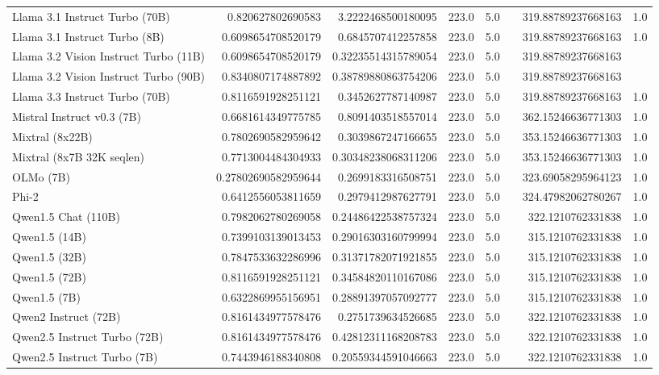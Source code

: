 \begin{table}[htp]
{\begin{tabular}{lrrrrrrr}
Llama 3.1 Instruct Turbo (70B) & 0.820627802690583 & 3.2222468500180095 & 223.0 & 5.0 &  & 319.88789237668163 & 1.0 \\
Llama 3.1 Instruct Turbo (8B) & 0.6098654708520179 & 0.6845707412257858 & 223.0 & 5.0 &  & 319.88789237668163 & 1.0 \\
Llama 3.2 Vision Instruct Turbo (11B) & 0.6098654708520179 & 0.32235514315789054 & 223.0 & 5.0 &  & 319.88789237668163 &  \\
Llama 3.2 Vision Instruct Turbo (90B) & 0.8340807174887892 & 0.38789880863754206 & 223.0 & 5.0 &  & 319.88789237668163 &  \\
Llama 3.3 Instruct Turbo (70B) & 0.8116591928251121 & 0.3452627787140987 & 223.0 & 5.0 &  & 319.88789237668163 & 1.0 \\
Mistral Instruct v0.3 (7B) & 0.6681614349775785 & 0.8091403518557014 & 223.0 & 5.0 &  & 362.15246636771303 & 1.0 \\
Mixtral (8x22B) & 0.7802690582959642 & 0.3039867247166655 & 223.0 & 5.0 &  & 353.15246636771303 & 1.0 \\
Mixtral (8x7B 32K seqlen) & 0.7713004484304933 & 0.30348238068311206 & 223.0 & 5.0 &  & 353.15246636771303 & 1.0 \\
OLMo (7B) & 0.27802690582959644 & 0.2699183316508751 & 223.0 & 5.0 &  & 323.69058295964123 & 1.0 \\
Phi-2 & 0.6412556053811659 & 0.2979412987627791 & 223.0 & 5.0 &  & 324.47982062780267 & 1.0 \\
Qwen1.5 Chat (110B) & 0.7982062780269058 & 0.24486422538757324 & 223.0 & 5.0 &  & 322.1210762331838 & 1.0 \\
Qwen1.5 (14B) & 0.7399103139013453 & 0.29016303160799994 & 223.0 & 5.0 &  & 315.1210762331838 & 1.0 \\
Qwen1.5 (32B) & 0.7847533632286996 & 0.31371782071921855 & 223.0 & 5.0 &  & 315.1210762331838 & 1.0 \\
Qwen1.5 (72B) & 0.8116591928251121 & 0.34584820110167086 & 223.0 & 5.0 &  & 315.1210762331838 & 1.0 \\
Qwen1.5 (7B) & 0.6322869955156951 & 0.28891397057092777 & 223.0 & 5.0 &  & 315.1210762331838 & 1.0 \\
Qwen2 Instruct (72B) & 0.8161434977578476 & 0.2751739634526685 & 223.0 & 5.0 &  & 322.1210762331838 & 1.0 \\
Qwen2.5 Instruct Turbo (72B) & 0.8161434977578476 & 0.42812311168208783 & 223.0 & 5.0 &  & 322.1210762331838 & 1.0 \\
Qwen2.5 Instruct Turbo (7B) & 0.7443946188340808 & 0.20559344591046663 & 223.0 & 5.0 &  & 322.1210762331838 & 1.0 \\

\end{tabular}}
\end{table}
